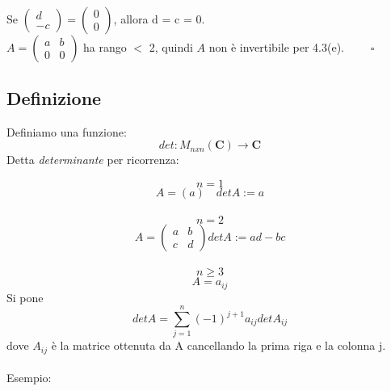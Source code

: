 \documentclass[12pt]{article}
\begin{document}
\\
Se $\begin{pmatrix}
    d\\
    -c
\end{pmatrix} =  \begin{pmatrix}
    0\\
    0
\end{pmatrix}$, allora d = c = 0.\\
$A = \begin{pmatrix}
    a & b\\
    0 & 0
\end{pmatrix}$ ha rango $<$ 2, quindi $A$ non è invertibile per 4.3(e). $\quad \quad \square$

\subsection{Definizione}

Definiamo una funzione: \[
det: M_{nxn} (\mathbf{C}) \rightarrow \mathbf{C}
\]
Detta \textit{determinante} per ricorrenza:

\[n = 1\]
\[A = (a) \quad det A := a\]
\\
\[n = 2\]\[A = \begin{pmatrix}
    a & b\\
    c & d
\end{pmatrix} det A := ad - bc\]
\\
\[n \ge 3\]
\[A = a_{ij}\]
Si pone
\[det A = \sum^n_{j = 1} (-1)^{j+1} a_{ij} detA_{ij}\]
dove $A_{ij}$ è la matrice ottenuta da A cancellando la prima riga e la colonna j.\\\\
Esempio:
\end{document}
